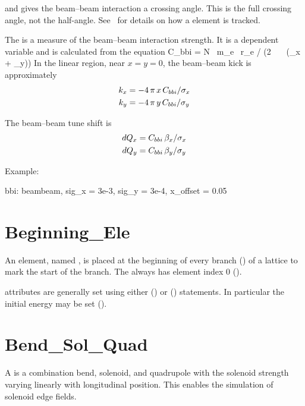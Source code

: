  and  gives the beam--beam interaction a
crossing angle. This is the full crossing angle, not the half-angle.
See~ for details on how a  element is tracked.

The  is a measure of the beam--beam interaction
strength.  It is a dependent variable and is calculated from the
equation
\Begineq
  C_{bbi} = N \, m_e \, r_e / (2 \, \pi \, \gamma \, (\sigma_x + \sigma_y))
\Endeq
In the linear region, near $x = y = 0$, the 
beam--beam kick is approximately 
\begin{align}
  k_x &= -4\, \pi \, x \, C_{bbi} / \sigma_x \nonumber \\
  k_y &= -4\, \pi \, y \, C_{bbi} / \sigma_y 
\end{align}

The beam--beam tune shift is 
\begin{align}
  dQ_x &= C_{bbi} \, \beta_x / \sigma_x \nonumber \\
  dQ_y &= C_{bbi} \, \beta_y / \sigma_y \nonumber \\
\end{align}

Example:
\begin{example}
  bbi: beambeam, sig_x = 3e-3, sig_y = 3e-4, x_offset = 0.05
\end{example}

\section{Beginning_Ele}
\label{s:begin.ele}

An  element, named , is placed at the
beginning of every branch () of a lattice to mark
the start of the branch. The  always has element index 0
().

 attributes are generally set using either 
() or  () statements.
In particular the initial energy may be set ().

\section{Bend_Sol_Quad}
\label{s:bsq}

A  is a combination bend, solenoid, and quadrupole
with the solenoid strength varying linearly with longitudinal position.
This enables the simulation of solenoid edge fields. 

